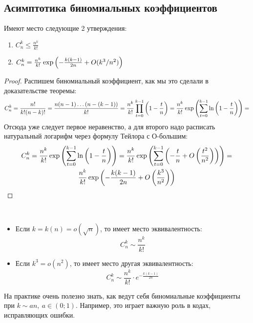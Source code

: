 \subsection{Асимптотика биномиальных коэффициентов}

\begin{lemma}
	Имеют место следующие 2 утверждения:
	\begin{enumerate}
		\item \(C_n^k \le \frac{n^k}{k!}\)
		
		\item \(C_n^k = \frac{n^k}{k!} \exp \left(-\frac{k(k - 1)}{2n} + O(k^3 / n^2)\right)\)
	\end{enumerate}
\end{lemma}

\begin{proof}
	Распишем биномиальный коэффициент, как мы это сделали в доказательстве теоремы:
	\begin{multline*}
		C_n^k = \frac{n!}{k! (n - k)!} = \frac{n(n - 1) \ldots (n - (k - 1))}{k!} = \frac{n^k}{k!} \prod_{t = 0}^{k - 1} \left(1 - \frac{t}{n}\right) = \frac{n^k}{k!} \exp\left(\sum_{t = 0}^{k - 1} \ln\left(1 - \frac{t}{n}\right)\right) =
	\end{multline*}
	Отсюда уже следует первое неравенство, а для второго надо расписать натуральный логарифм через формулу Тейлора с О-большим:
	\begin{multline*}
		C_n^k = \frac{n^k}{k!} \exp\left(\sum_{t = 0}^{k - 1} \ln\left(1 - \frac{t}{n}\right)\right) = \frac{n^k}{k!} \exp\left(\sum_{t = 0}^{k - 1} \left(-\frac{t}{n} + O\left(\frac{t^2}{n^2}\right)\right)\right) =
		\\
		\frac{n^k}{k!} \exp\left(-\frac{k(k - 1)}{2n} + O\left(\frac{k^3}{n^2}\right)\right)
	\end{multline*}
\end{proof}

\begin{corollary}~
	\begin{itemize}
		\item Если $k = k(n) = o(\sqrt{n})$, то имеет место эквивалентность:
		\[
			C_n^k \sim \frac{n^k}{k!}
		\]
		
		\item Если $k^3 = o(n^2)$, то имеет место другая эквивалентность:
		\[
			C_n^k \sim \frac{n^k}{k!} \cdot e^{-\frac{k(k - 1)}{2n}}
		\]
	\end{itemize}
\end{corollary}

\begin{note}
	На практике очень полезно знать, как ведут себя биномиальные коэффициенты при $k \sim an,\ a \in (0; 1)$. Например, это играет важную роль в кодах, исправляющих ошибки.
\end{note}


